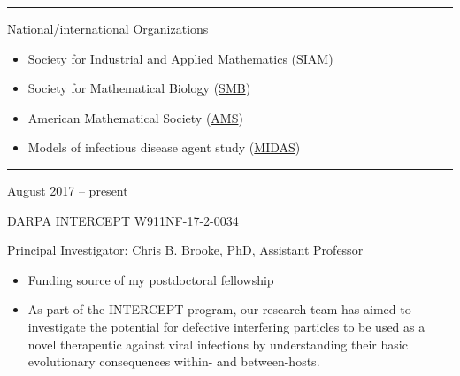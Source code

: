 \documentclass[a4paper,10pt]{article}
\newlength{\cvcolumngapwidth}
\newlength{\cvleftcolumnwidth}
\newlength{\cvrightcolumnwidth}
\newcommand{\cvsectionstyle}[1]{{\normalsize\cvsectionfont\textcolor{cvsectioncolor}{#1}}}
\newcommand{\cvtitlestyle}[1]{{\large\cvtitlefont\textcolor{cvtitlecolor}{#1}}}
\newcommand{\cvheadingstyle}[1]{{\normalsize\cvheadingfont\textcolor{cvheadingcolor}{#1}}}
\newlength{\cvafteritemskipamount}
\newlength{\cvaftersectionskipamount}
\newlength{\cvbetweensectionandheadingextraskipamount}
\newlength{\cvaftertitleskipamount}
\newlength{\cvparskip}
\newcommand{\cvsection}[1]{
    \begin{minipage}[t]{\cvleftcolumnwidth}
        \raggedleft\cvsectionstyle{#1}
    \end{minipage}%
    \hspace{\cvcolumngapwidth}%
    \begin{minipage}[t]{\cvrightcolumnwidth}
        \textcolor{cvrulecolor}{\rule{\cvrightcolumnwidth}{0.3mm}}
    \end{minipage}

    \vspace{\cvaftersectionskipamount}
}
\newcommand{\cvitem}[2]{
    \begin{minipage}[t]{\cvleftcolumnwidth}
        \raggedleft #1
    \end{minipage}%
    \hspace{\cvcolumngapwidth}%
    \begin{minipage}[t]{\cvrightcolumnwidth}
        \setlength{\parskip}{\cvparskip} #2
    \end{minipage}

    \vspace{\cvafteritemskipamount}
}
\newcommand{\cvtitle}[1]{
    \cvtitlestyle{#1}

    \vspace{\cvaftertitleskipamount}
    \vspace{-\cvparskip}
}
\begin{document}
\newpage
\cvsection{CURRENT PROFESSIONAL MEMBERSHIPS}

\cvitem{
    \cvheadingstyle{}
}{
    \cvtitle{National/international Organizations}
    \begin{itemize}[leftmargin=*]
        \item Society for Industrial and Applied Mathematics (\href{https://www.siam.org/}{SIAM}) 
    	\item Society for Mathematical Biology (\href{https://www.smb.org/}{SMB})
        \item American Mathematical Society (\href{https://www.ams.org/home/page}{AMS})
        \item Models of infectious disease agent study (\href{https://midasnetwork.us/}{MIDAS})
    \end{itemize}
    
}


%
%


\cvsection{FUNDING ACKNOWLEDGMENTS}
\vspace{\cvbetweensectionandheadingextraskipamount}

\cvitem{
    \cvheadingstyle{August 2017 -- present}
}{
    \cvtitle{DARPA INTERCEPT W911NF-17-2-0034} 
    Principal Investigator: Chris B. Brooke, PhD, Assistant Professor
    \begin{itemize}
	\item Funding source of my postdoctoral fellowship
    	\item As part of the INTERCEPT program, our research team has aimed to investigate the potential for defective interfering particles to be used as a novel therapeutic against viral infections by understanding their basic evolutionary consequences within- and between-hosts.
    \end{itemize}
    
}
\end{document}
